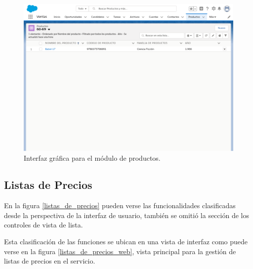 \begin{figure}
\centering
\includegraphics[width=1.0\textwidth]{graphics/productos.eps}
\caption{Interfaz gráfica para el módulo de productos.}
\label{productos_web}
\end{figure}

\subsection{Listas de Precios}
En la figura \ref{listas_de_precios} pueden verse las funcionalidades
clasificadas desde la perspectiva de la interfaz de usuario, también se omitió
la sección de los controles de vista de lista.

Esta clasificación de las funciones se ubican en una vista de interfaz como
puede verse en la figura \ref{listas_de_precios_web}, vista principal para la
gestión de listas de precios en el servicio.

